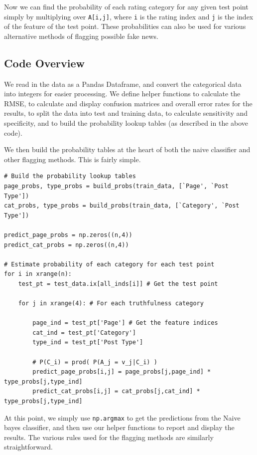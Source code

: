 \documentclass[12pt]{article}
\begin{document}
Now we can find the probability of each rating category for any given test point simply by multiplying over \texttt{A[i,j]}, where \texttt{i} is the rating index and \texttt{j} is the index of the feature of the test point. These probabilities can also be used for various alternative methods of flagging possible fake news.

\subsection*{Code Overview}

We read in the data as a Pandas Dataframe, and convert the categorical data into integers for easier processing. We define helper functions to calculate the RMSE, to calculate and display confusion matrices and overall error rates for the results, to split the data into test and training data, to calculate sensitivity and specificity, and to build the probability lookup tables  (as described in the above code).

We then build the probability tables at the heart of both the naive classifier and other flagging methods. This is fairly simple.
\begin{lstlisting}
# Build the probability lookup tables
page_probs, type_probs = build_probs(train_data, [`Page', `Post Type'])
cat_probs, type_probs = build_probs(train_data, [`Category', `Post Type'])

predict_page_probs = np.zeros((n,4))
predict_cat_probs = np.zeros((n,4))

# Estimate probability of each category for each test point
for i in xrange(n):
    test_pt = test_data.ix[all_inds[i]] # Get the test point
    
    for j in xrange(4): # For each truthfulness category
        
        page_ind = test_pt['Page'] # Get the feature indices
        cat_ind = test_pt['Category']
        type_ind = test_pt['Post Type']
        
        # P(C_i) = prod( P(A_j = v_j|C_i) )
        predict_page_probs[i,j] = page_probs[j,page_ind] * type_probs[j,type_ind]
        predict_cat_probs[i,j] = cat_probs[j,cat_ind] * type_probs[j,type_ind]
\end{lstlisting}

At this point, we simply use \texttt{np.argmax} to get the predictions from the Naive bayes classifier, and then use our helper functions to report and display the results. The various rules used for the flagging methods are similarly straightforward.
\end{document}
